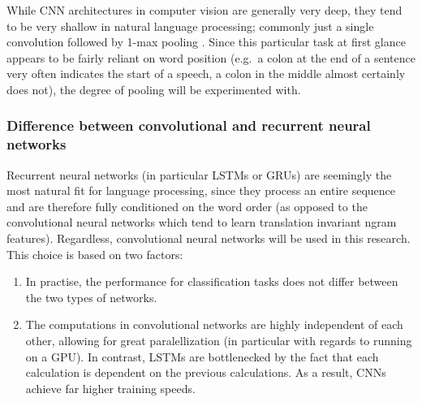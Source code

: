 While CNN architectures in computer vision are generally very deep, they tend to
be very shallow in natural language processing; commonly just a single
convolution followed by 1-max pooling \citep{zhang2015conv}. Since this
particular task at first glance appears to be fairly reliant on word position
(e.g.\ a colon at the end of a sentence very often indicates the start of a
speech, a colon in the middle almost certainly does not), the degree of pooling
will be experimented with.

\subsubsection{Difference between convolutional and recurrent neural networks}
Recurrent neural networks (in particular LSTMs or GRUs) are seemingly the most
natural fit for language processing, since they process an entire sequence and
are therefore fully conditioned on the word order (as opposed to the
convolutional neural networks which tend to learn translation invariant ngram
features). Regardless, convolutional neural networks will be used in this
research. This choice is based on two factors:
\begin{enumerate}
\item In practise, the performance for classification tasks does not differ
  between the two types of networks.\citep{cnnrnn}
\item The computations in convolutional networks are highly independent of
  each other, allowing for great paralellization (in particular with regards to
  running on a GPU). In contrast, LSTMs are bottlenecked by the fact that each
  calculation is dependent on the previous calculations. As a result, CNNs
  achieve far higher training speeds.\citep{facebook}
\end{enumerate}

